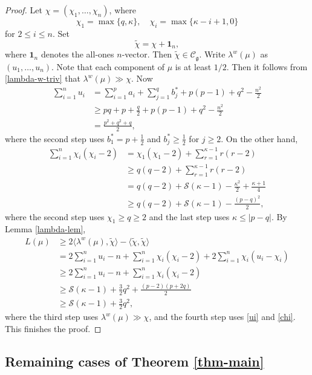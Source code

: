 \documentclass[11pt]{amsart}
\theoremstyle{plain}
\theoremstyle{definition}
\newcommand{\mfg}{\mathfrak{g}}
\newcommand{\C}{\mathcal{C}}
\newcommand{\caS}{\mathcal{S}}
\begin{document}
\begin{proof}
	Let $\chi=(\chi_1,\dots,\chi_n)$, where
	\[\chi_1=\max\{q,\kappa\},\quad \chi_i=\max\{\kappa-i+1,0\}\]
	for $2\le i\le n$. Set
	\[\widetilde{\chi}=\chi+\textbf{1}_n,\]
	where $\textbf{1}_n$ denotes the all-ones $n$-vector. Then $\widetilde{\chi}\in \C_\mfg$.  Write $\lambda^w(\mu)$ as $(u_1,\dots,u_n)$. Note that each component of  $\mu$ is at least $1/2$. Then it follows from \eqref{lambda-w-triv} that $\lambda^w(\mu)\gg \chi$. Now
	\begin{equation}\label{ui}
	\begin{split}
		\sum_{i=1}^n u_i&= \sum_{i=1}^p a_i+\sum_{j=1}^qb_j^*+p(p-1)+q^2-\frac{n^2}{2}\\
		&\ge pq+p+\frac{q}{2}+p(p-1)+q^2-\frac{n^2}{2}\\
		&= \frac{p^2+q^2+q}{2},
	\end{split}
\end{equation}
where the second step uses $b_1^*=p+\frac{1}{2}$ and $b_j^*\ge \frac{1}{2}$ for $j\ge 2$.
	On the other hand,
	\begin{equation}\label{chi}
	\begin{split}
		\sum_{i=1}^n\chi_i(\chi_i-2)&=\chi_1(\chi_1-2)+\sum_{r=1}^{\kappa-1}r(r-2)\\
		&\ge q(q-2)+\sum_{r=1}^{\kappa-1}r(r-2)\\
		&=q(q-2)+\caS(\kappa-1)-\frac{\kappa^2}{2}+\frac{\kappa+1}{4}\\
		&\ge q(q-2)+\caS(\kappa-1)-\frac{(p-q)^2}{2},
	\end{split}
	\end{equation}
	where the second step uses $\chi_1\ge q\ge 2$ and the last step uses $\kappa\le |p-q|$.
	By Lemma \ref{lambda-lem},
	\begin{align*}
		L(\mu)&\ge 2\langle\lambda^w(\mu),\widetilde{\chi}\rangle-\langle\widetilde{\chi},\widetilde{\chi}\rangle\\
		&= 2\sum_{i=1}^n u_i-n+\sum_{i=1}^n\chi_i(\chi_i-2)+2\sum_{i=1}^n\chi_i(u_i-\chi_i)\\
		&\ge 2\sum_{i=1}^n u_i-n+\sum_{i=1}^n\chi_i(\chi_i-2)\\
		&\ge \caS(\kappa-1)+\frac{3}{2}q^2+\frac{(p-2)(p+2q)}{2}\\
		&\ge \caS(\kappa-1)+\frac{3}{2}q^2,
	\end{align*}
	where the third step uses $\lambda^w(\mu)\gg \chi$, and the fourth step uses \eqref{ui} and \eqref{chi}. This finishes the proof.
\end{proof}


\subsection{Remaining cases of Theorem \ref{thm-main}}
\end{document}
